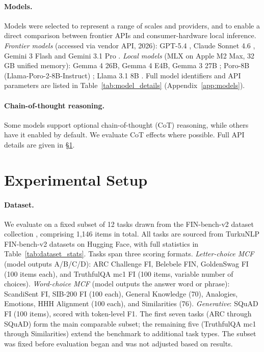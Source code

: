 \documentclass[11pt]{article}
\begin{document}
\paragraph{Models.}
Models were selected to represent a range of scales and providers, and to
enable a direct comparison between frontier APIs and consumer-hardware local
inference.
\textit{Frontier models} (accessed via vendor API, 2026):
GPT-5.4 \cite{openai2025gpt54},
Claude Sonnet 4.6 \cite{anthropic2025claude},
Gemini 3 Flash and Gemini 3.1 Pro \cite{google2025gemini3}.
\textit{Local models} (MLX on Apple M2 Max, 32 GB unified memory):
Gemma 4 26B, Gemma 4 E4B, Gemma 3 27B
\cite{google2025gemma4};
Poro-8B (Llama-Poro-2-8B-Instruct) \cite{luukkonen2023fingpt};
Llama 3.1 8B \cite{dubey2024llama3}.
Full model identifiers and API parameters are listed in
Table~\ref{tab:model_details} (Appendix~\ref{app:models}).

\paragraph{Chain-of-thought reasoning.}
Some models support optional chain-of-thought (CoT) reasoning, while others
have it enabled by default.
We evaluate CoT effects where possible. Full API details are given in
\S\ref{sec:setup}.

\section{Experimental Setup}
\label{sec:setup}

\paragraph{Dataset.}
We evaluate on a fixed subset of 12 tasks drawn from the FIN-bench-v2
dataset collection \cite{kytoniemi2025}, comprising 1{,}146 items in total.
All tasks are sourced from TurkuNLP FIN-bench-v2 datasets on Hugging Face,
with full statistics in Table~\ref{tab:dataset_stats}.
Tasks span three scoring formats.
\textit{Letter-choice MCF} (model outputs A/B/C/D): ARC Challenge FI,
Belebele FIN, GoldenSwag FI (100 items each), and TruthfulQA mc1 FI
(100 items, variable number of choices).
\textit{Word-choice MCF} (model outputs the answer word or phrase):
ScandiSent FI, SIB-200 FI (100 each), General Knowledge (70),
Analogies, Emotions, HHH Alignment (100 each), and Similarities (76).
\textit{Generative}: SQuAD FI (100 items), scored with token-level F1.
The first seven tasks (ARC through SQuAD) form the main comparable subset;
the remaining five (TruthfulQA mc1 through Similarities) extend the benchmark
to additional task types.
The subset was fixed before evaluation began and was not adjusted
based on results.
\end{document}
